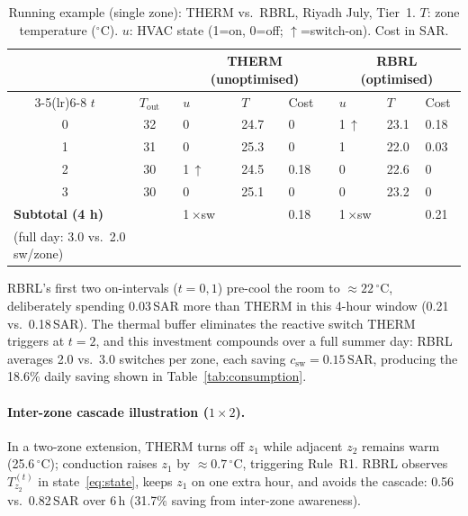 \documentclass[3p,number]{elsarticle}
\newcommand{\Tout}{T_{\mathrm{out}}}
\newcommand{\csw}{c_{\mathrm{sw}}}
\newcommand{\SAR}{\text{SAR}}
\begin{document}
\begin{table}[!t]
\centering
\caption{Running example (single zone): THERM vs.\ RBRL, Riyadh July,
Tier~1. $T$: zone temperature ($^\circ$C). $u$: HVAC state
(1=on, 0=off; $\uparrow$=switch-on). Cost in SAR.}
\label{tab:example}
\setlength{\tabcolsep}{3.5pt}
\begin{tabularx}{\linewidth}{@{}ccXXXXXX@{}}
\toprule
& & \multicolumn{3}{c}{\textbf{THERM (unoptimised)}}
  & \multicolumn{3}{c}{\textbf{RBRL (optimised)}} \\
\cmidrule(lr){3-5}\cmidrule(lr){6-8}
$t$ & $\Tout$ & $u$ & $T$ & Cost & $u$ & $T$ & Cost \\
\midrule
0 & 32 & 0 & 24.7 & 0    & 1\,$\uparrow$ & 23.1 & 0.18 \\
1 & 31 & 0 & 25.3 & 0    & 1             & 22.0 & 0.03 \\
2 & 30 & 1\,$\uparrow$ & 24.5 & 0.18 & 0 & 22.6 & 0 \\
3 & 30 & 0 & 25.1 & 0    & 0             & 23.2 & 0    \\
\midrule
\multicolumn{2}{l}{\textbf{Subtotal (4 h)}}
  & 1\,$\times$sw & & 0.18 & 1\,$\times$sw & & 0.21 \\
\multicolumn{2}{l}{\footnotesize(full day: 3.0 vs.\ 2.0 sw/zone)} & & & & & & \\
\bottomrule
\end{tabularx}
\end{table}
 
RBRL's first two on-intervals ($t=0,1$) pre-cool the room to $\approx22\,^\circ$C, deliberately spending 0.03\,SAR more than THERM in this 4-hour window (0.21 vs.\ 0.18\,SAR).
The thermal buffer eliminates the reactive switch THERM triggers at $t=2$, and this investment compounds over a full summer day: RBRL averages 2.0 vs.\ 3.0 switches per zone, each saving $\csw=0.15\,\SAR$, producing the 18.6\% daily saving shown in Table~\ref{tab:consumption}.
 
\paragraph{Inter-zone cascade illustration ($1\times2$).}%
\label{subsec:running_ex}
In a two-zone extension, THERM turns off $z_1$ while adjacent $z_2$ remains warm (25.6\,$^\circ$C); conduction raises $z_1$ by ${\approx}0.7\,^\circ$C, triggering Rule~R1.
RBRL observes $T_{z_2}^{(t)}$ in state~\eqref{eq:state}, keeps $z_1$ on one extra hour, and avoids the cascade: 0.56 vs.\ 0.82\,SAR over 6\,h (31.7\% saving from inter-zone awareness).
 
\end{document}
